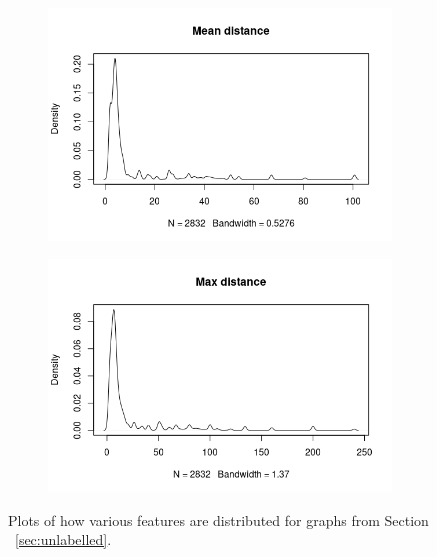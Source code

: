 \documentclass{l4proj}
\theoremstyle{definition}
\theoremstyle{remark}
\begin{document}
\begin{figure}
\begin{subfigure}[t]{0.49\textwidth}
  \end{subfigure}
  \begin{subfigure}[t]{0.49\textwidth}
    \centering
    \includegraphics[width=\textwidth]{images/sip_meandist.png}
  \end{subfigure}
  \begin{subfigure}[t]{0.49\textwidth}
    \centering
    \includegraphics[width=\textwidth]{images/sip_maxdist.png}
  \end{subfigure}
  \caption{Plots of how various features are distributed for graphs from Section
 ~\ref{sec:unlabelled}.}
  \label{fig:sip_features1}
\end{figure}
\end{document}
